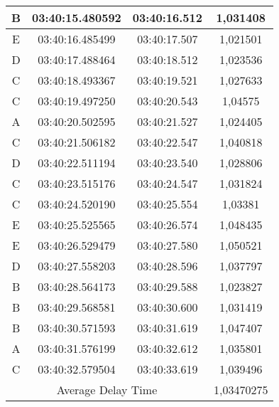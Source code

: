 \begin{table}[!ht]
\begin{tabular}{|ccc|c|}
    \multicolumn{1}{|c|}{B}    & \multicolumn{1}{c|}{03:40:15.480592} & 03:40:16.512       & 1,031408   \\ \hline
    \multicolumn{1}{|c|}{E}    & \multicolumn{1}{c|}{03:40:16.485499} & 03:40:17.507       & 1,021501   \\ \hline
    \multicolumn{1}{|c|}{D}    & \multicolumn{1}{c|}{03:40:17.488464} & 03:40:18.512       & 1,023536   \\ \hline
    \multicolumn{1}{|c|}{C}    & \multicolumn{1}{c|}{03:40:18.493367} & 03:40:19.521       & 1,027633   \\ \hline
    \multicolumn{1}{|c|}{C}    & \multicolumn{1}{c|}{03:40:19.497250} & 03:40:20.543       & 1,04575    \\ \hline
    \multicolumn{1}{|c|}{A}    & \multicolumn{1}{c|}{03:40:20.502595} & 03:40:21.527       & 1,024405   \\ \hline
    \multicolumn{1}{|c|}{C}    & \multicolumn{1}{c|}{03:40:21.506182} & 03:40:22.547       & 1,040818   \\ \hline
    \multicolumn{1}{|c|}{D}    & \multicolumn{1}{c|}{03:40:22.511194} & 03:40:23.540       & 1,028806   \\ \hline
    \multicolumn{1}{|c|}{C}    & \multicolumn{1}{c|}{03:40:23.515176} & 03:40:24.547       & 1,031824   \\ \hline
    \multicolumn{1}{|c|}{C}    & \multicolumn{1}{c|}{03:40:24.520190} & 03:40:25.554       & 1,03381    \\ \hline
    \multicolumn{1}{|c|}{E}    & \multicolumn{1}{c|}{03:40:25.525565} & 03:40:26.574       & 1,048435   \\ \hline
    \multicolumn{1}{|c|}{E}    & \multicolumn{1}{c|}{03:40:26.529479} & 03:40:27.580       & 1,050521   \\ \hline
    \multicolumn{1}{|c|}{D}    & \multicolumn{1}{c|}{03:40:27.558203} & 03:40:28.596       & 1,037797   \\ \hline
    \multicolumn{1}{|c|}{B}    & \multicolumn{1}{c|}{03:40:28.564173} & 03:40:29.588       & 1,023827   \\ \hline
    \multicolumn{1}{|c|}{B}    & \multicolumn{1}{c|}{03:40:29.568581} & 03:40:30.600       & 1,031419   \\ \hline
    \multicolumn{1}{|c|}{B}    & \multicolumn{1}{c|}{03:40:30.571593} & 03:40:31.619       & 1,047407   \\ \hline
    \multicolumn{1}{|c|}{A}    & \multicolumn{1}{c|}{03:40:31.576199} & 03:40:32.612       & 1,035801   \\ \hline
    \multicolumn{1}{|c|}{C}    & \multicolumn{1}{c|}{03:40:32.579504} & 03:40:33.619       & 1,039496   \\ \hline
    \multicolumn{3}{|c|}{Average Delay Time}                                               & 1,03470275 \\ \hline
  \end{tabular}
\end{table}

